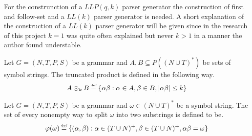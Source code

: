 For the construnction of a $LLP(q,k)$ parser generator the construction of first and follow-set\cite[p. 5]{Vagner2007} and a $LL(k)$ parser generator is needed. A short explanation of the construction of a $LL(k)$ parser generator will be given since in the research of this project $k = 1$ was quite often explained but never $k > 1$ in a manner the author found understable.

\begin{definition}
    Let $G = (N, T, P, S)$ be a grammar and $A, B \subseteq P((N \cup T)^*)$ be sets of symbol strings. The truncated product is defined in the following way.
    \begin{gather*}
        A \odot_k B \defeq \{\alpha\beta : \alpha \in A, \beta \in B, |\alpha\beta|\leq k \}
    \end{gather*}
\end{definition}

\begin{definition}
    Let $G = (N, T, P, S)$ be a grammar and $\omega \in (N \cup T)^*$ be a symbol string. The set of every nonempty way to split $\omega$ into two substrings is defined to be.
    \begin{gather*}
        \varphi(\omega) \defeq \{(\alpha, \beta) : \alpha \in (T \cup N)^+, \beta \in (T \cup N)^+, \alpha\beta = \omega\}
    \end{gather*}
\end{definition}

